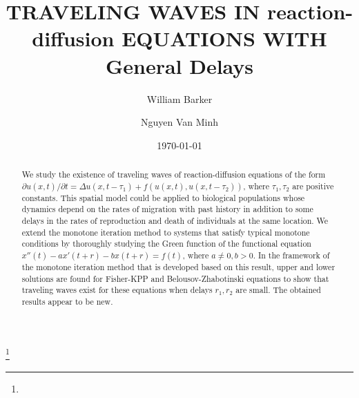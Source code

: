 \documentclass[12pt,letterpaper]{amsart}
\theoremstyle{definition}
\theoremstyle{remark}
\numberwithin{equation}{section}
\begin{document}
\def\C{\mathbb C}
\def\R{\mathbb R}
\def\X{\mathbb X}
\def\Z{\mathbb Z}
\def\Y{\mathbb Y}
\def\Z{\mathbb Z}
\def\N{\mathbb N}
\def\cal{\mathcal}
\def\cD{\cal D}
\def\tD{\tilde{{\cal D}}}
\def\F{\cal F}
\def\tf{\tilde{f}}
\def\tg{\tilde{g}}
\def\tu{\tilde{u}}



\def\cal{\mathcal}
\def\b{\mathcal B}
\def\c{\mathcal C}
\def\cc{\mathbb C}
\def\x{\mathbb X}
\def\r{\mathbb R}
\def\T{\mathbb T}
\def\uu{(U(t,s))_{t\ge s}}
\def\vv{(V(t,s))_{t\ge s}}
\def\xx{(X(t,s))_{t\ge s}}
\def\yy{(Y(t,s))_{t\ge s}}
\def\zz{(Z(t,s))_{t\ge s}}
\def\ss{(S(t))_{t\ge 0}}
\def\tt{(T(t,s))_{t\ge s}}
\def\rr{(R(t))_{t\ge 0}}
\title[Traveling waves]{\textbf{TRAVELING WAVES IN reaction-diffusion EQUATIONS WITH General Delays}}


\author[Barker]{William Barker}
\address{Department of Mathematics and Statistics, University of Arkansas at Little Rock, \\
	2801 
	S University Ave, Little Rock, AR 72204. USA\\
	Email: wkbarker@ualr.edu}
 
\author[N.V. Minh]{Nguyen Van Minh}
\address{Department of Mathematics and Statistics, University of Arkansas at Little Rock, \\
	2801 
	S University Ave, Little Rock, AR 72204. USA\\
Email: mvnguyen1@ualr.edu}
 

\thanks{}


\date{\today}

\begin{abstract} We study the existence of traveling waves of reaction-diffusion equations of the form $\partial u(x,t)/\partial t = \Delta u(x,t-\tau_1)+f(u(x,t),u(x,t-\tau_2))$, where $\tau_1,\tau_2$ are positive constants. This spatial model could be applied to biological populations whose dynamics depend on the rates of migration with past history in addition to some delays in the rates of reproduction and death of individuals at  the same location.	
	We extend the monotone iteration method to systems that satisfy typical monotone conditions by thoroughly studying the Green function of the functional equation $x''(t)-ax'(t+r)-bx(t+r)=f(t)$, where $a\not=0, b>0$. In the framework of the monotone iteration method that is developed based on this result, upper and lower solutions are found for Fisher-KPP and Belousov-Zhabotinski equations to show that traveling waves exist for these equations when delays $r_1,r_2$  are small. The obtained results appear to be new.
\end{abstract}
\maketitle
\end{document}
